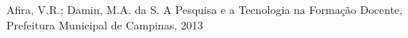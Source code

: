\documentclass[
12pt,		%
openright,	%
twoside,  %
a4paper,			%
chapter=TITLE,		%
english,			%
french,				%
spanish,			%
brazil				%
]{USPSC-classe/USPSC}
\begin{document}
\begin{flushleft}
\begin{flushleft}
\begin{flushleft}
\begin{flushleft}
\begin{flushleft}
\begin{flushleft}
\begin{flushleft}
\begin{flushleft}
\begin{flushleft}
\begin{flushleft}
[AFIRA, 2013] Afira, V.R.; Damin, M.A. da S. A Pesquisa e a Tecnologia na Forma\c{c}\~ao Docente, Prefeitura Municipal de Campinas, 2013
\end{flushleft}


\end{flushleft}


\end{flushleft}


\end{flushleft}


\end{flushleft}


\end{flushleft}


\end{flushleft}


\end{flushleft}


\end{flushleft}


\end{flushleft}
\end{document}
